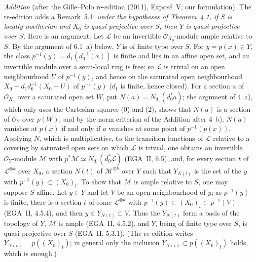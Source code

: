 \par\medskip\noindent
\emph{Addition} (after the Gille--Polo re-edition (2011), Exposé~V; our
formulation). The re-edition adds a Remark~5.1: \emph{under the hypotheses of
\hyperref[thm:sga3-V-4.1]{Theorem~4.1}, if \(S\) is locally noetherian and \(X_0\) is quasi-projective
over \(S\), then \(Y\) is quasi-projective over \(S\).} Here is an argument.
Let \(\mathscr L\) be an invertible \(\mathcal O_{X_0}\)-module ample relative
to \(S\). By the argument of 6.1~a) below, \(Y\) is of finite type over \(S\).
For \(y=p(x)\in Y\), the class \(p^{-1}(y)=d_1(d_0^{-1}(x))\) is finite and lies
in an affine open set, and an invertible module over a semi-local ring is
free; so \(\mathscr L\) is trivial on an open neighbourhood \(U\) of \(p^{-1}(y)\), and hence
on the saturated open neighbourhood \(X_0-d_1d_0^{-1}(X_0-U)\) of \(p^{-1}(y)\)
(\(d_1\) is finite, hence closed). For a section \(a\) of \(\mathcal O_{X_0}\) over
a saturated open set \(W\), put \(N(a)=N_{d_1}(d_0^\ast a)\); the argument of
4~a), which only uses the Cartesian squares (0) and (2), shows that
\(N(a)\) is a section of \(\mathcal O_Y\) over \(p(W)\), and by the norm criterion
of the Addition after 4~b), \(N(a)\) vanishes at \(p(x)\) if and only if \(a\)
vanishes at some point of \(p^{-1}(p(x))\). Applying \(N\), which is
multiplicative, to the transition functions of \(\mathscr L\) relative to a
covering by saturated open sets on which \(\mathscr L\) is trivial, one obtains
an invertible \(\mathcal O_Y\)-module \(\mathscr M\) with
\(p^\ast\mathscr M\simeq N_{d_1}(d_0^\ast\mathscr L)\) (EGA~II, 6.5), and, for every
section \(t\) of \(\mathscr L^{\otimes k}\) over \(X_0\), a section \(N(t)\) of
\(\mathscr M^{\otimes k}\) over \(Y\) such that \(Y_{N(t)}\) is the set of the \(y\)
with \(p^{-1}(y)\subset(X_0)_t\). To show that \(\mathscr M\) is ample relative
to \(S\), one may suppose \(S\) affine. Let \(y\in Y\) and let \(V\) be an open
neighbourhood of \(y\); as \(p^{-1}(y)\) is finite, there is a section \(t\) of
some \(\mathscr L^{\otimes k}\) with \(p^{-1}(y)\subset(X_0)_t\subset p^{-1}(V)\)
(EGA~II, 4.5.4), and then \(y\in Y_{N(t)}\subset V\). Thus the \(Y_{N(t)}\) form
a basis of the topology of \(Y\), \(\mathscr M\) is ample (EGA~II, 4.5.2), and
\(Y\), being of finite type over \(S\), is quasi-projective over \(S\) (EGA~II,
5.3.1). (The re-edition writes \(Y_{N(t)}=p((X_0)_t)\); in general only the
inclusion \(Y_{N(t)}\subset p((X_0)_t)\) holds, which is enough.)
\par\medskip

